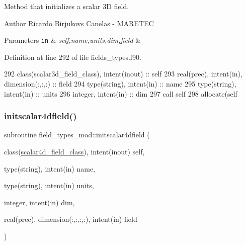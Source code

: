 Method that initializes a scalar 3D field. 

\begin{DoxyAuthor}{Author}
Ricardo Birjukovs Canelas -\/ M\+A\+R\+E\+T\+EC 
\end{DoxyAuthor}

\begin{DoxyParams}[1]{Parameters}
\mbox{\tt in}  & {\em self,name,units,dim,field} & \\
\hline
\end{DoxyParams}


Definition at line 292 of file fields\+\_\+types.\+f90.


\begin{DoxyCode}
292     \textcolor{keywordtype}{class}(scalar3d\_field\_class), \textcolor{keywordtype}{intent(inout)} :: self
293     \textcolor{keywordtype}{real(prec)}, \textcolor{keywordtype}{intent(in)}, \textcolor{keywordtype}{dimension(:,:,:)} :: field
294     \textcolor{keywordtype}{type}(string), \textcolor{keywordtype}{intent(in)} :: name
295     \textcolor{keywordtype}{type}(string), \textcolor{keywordtype}{intent(in)} :: units
296     \textcolor{keywordtype}{integer}, \textcolor{keywordtype}{intent(in)} :: dim
297     \textcolor{keyword}{call }self%
298     \textcolor{keyword}{allocate}(self%
\end{DoxyCode}
\mbox{\label{namespacefield__types__mod_a52e2310f95a85bf65d4a85427814a5ad}} 
\subsubsection{\texorpdfstring{initscalar4dfield()}{initscalar4dfield()}}
{\footnotesize\ttfamily subroutine field\+\_\+types\+\_\+mod\+::initscalar4dfield (\begin{DoxyParamCaption}\item[{class(\mbox{\hyperlink{structfield__types__mod_1_1scalar4d__field__class}{scalar4d\+\_\+field\+\_\+class}}), intent(inout)}]{self,  }\item[{type(string), intent(in)}]{name,  }\item[{type(string), intent(in)}]{units,  }\item[{integer, intent(in)}]{dim,  }\item[{real(prec), dimension(\+:,\+:,\+:,\+:), intent(in)}]{field }\end{DoxyParamCaption})\hspace{0.3cm}{\ttfamily [private]}}



